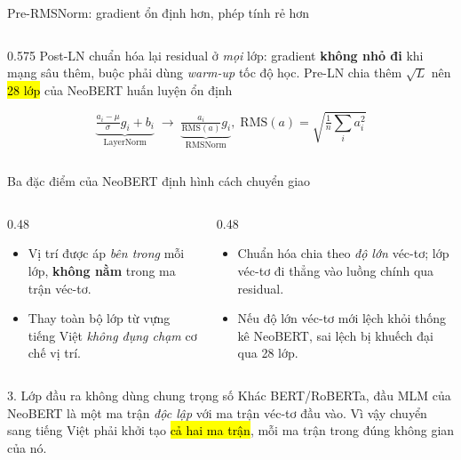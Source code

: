 \begin{frame}{Pre-RMSNorm: gradient ổn định hơn, phép tính rẻ hơn}
\begin{columns}[T]
\begin{column}{0.575\textwidth}
Post-LN chuẩn hóa lại residual ở \emph{mọi} lớp: gradient
\textbf{không nhỏ đi} khi mạng sâu thêm, buộc phải dùng
\textit{warm-up} tốc độ học. Pre-LN chia thêm $\sqrt{L}$ nên \hl{28 lớp} của
NeoBERT huấn luyện ổn định 

\vspace{0.15em}
\vspace{-0.45em}
\[\textstyle
  \underbrace{\tfrac{a_i-\mu}{\sigma}g_i+b_i}_{\text{LayerNorm}}
  \;\longrightarrow\;
  \underbrace{\tfrac{a_i}{\mathrm{RMS}(a)}g_i}_{\text{RMSNorm}},\;
  \mathrm{RMS}(a)=\sqrt{\tfrac{1}{n}\textstyle\sum_i a_i^2}
\]
\vspace{-0.5em}
\begin{flushright}\end{flushright}
\end{column}
\end{columns}
\end{frame}

\begin{frame}{Ba đặc điểm của NeoBERT định hình cách chuyển giao}
\vspace{0.4em}
\begin{columns}[T]
\begin{column}{0.48\textwidth}
  \begin{itemize}\itemsep2pt
    \item Vị trí được áp \emph{bên trong} mỗi lớp, \textbf{không nằm} trong
          ma trận véc-tơ.
    \item[$\Rightarrow$] Thay toàn bộ lớp từ vựng tiếng Việt
          \emph{không đụng chạm} cơ chế vị trí.
  \end{itemize}
\end{column}

\begin{column}{0.48\textwidth}
  \begin{itemize}\itemsep2pt
    \item Chuẩn hóa chia theo \emph{độ lớn} véc-tơ; lớp véc-tơ đi thẳng vào
          luồng chính qua residual.
    \item[$\Rightarrow$] Nếu độ lớn véc-tơ mới lệch khỏi thống kê NeoBERT,
          sai lệch bị khuếch đại qua 28 lớp.
  \end{itemize}
\end{column}
\end{columns}

\vspace{0.9em}
\begin{alertblock}{3. Lớp đầu ra không dùng chung trọng số}
  Khác BERT/RoBERTa, đầu MLM của NeoBERT là một ma trận \emph{độc lập} với
  ma trận véc-tơ đầu vào. Vì vậy chuyển sang tiếng Việt phải khởi tạo
  \hl{cả hai ma trận}, mỗi ma trận trong đúng không gian của nó.
\end{alertblock}
\end{frame}

